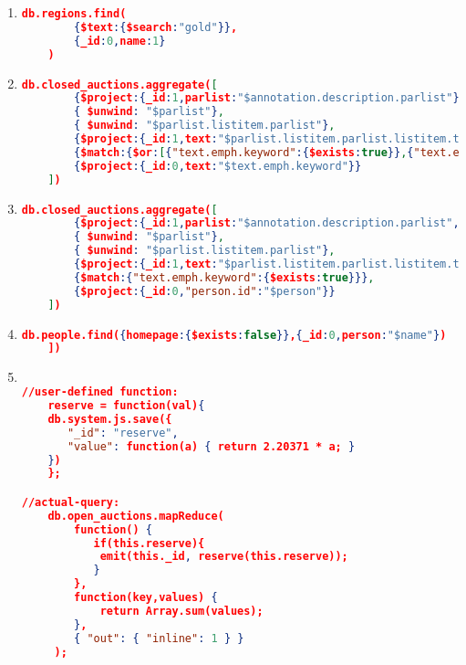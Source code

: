 \begin{enumerate}[label=Q\arabic*]
    \item \label{mongodb-q-14}%
	\begin{lstlisting}[language=JSON,   basicstyle=\scriptsize]
	  db.regions.find(
		{$text:{$search:"gold"}},
		{_id:0,name:1}
	)
	\end{lstlisting}
	
    \item \label{mongodb-q-15}%
	\begin{lstlisting}[language=JSON,   basicstyle=\scriptsize]
	 db.closed_auctions.aggregate([
		{$project:{_id:1,parlist:"$annotation.description.parlist"}},
		{ $unwind: "$parlist"},
		{ $unwind: "$parlist.listitem.parlist"},
		{$project:{_id:1,text:"$parlist.listitem.parlist.listitem.text"}},
		{$match:{$or:[{"text.emph.keyword":{$exists:true}},{"text.emph.keyword.childtext":{$exists:true}},{"text.emph.keyword.child":{$exists:true}}]}},
		{$project:{_id:0,text:"$text.emph.keyword"}}
	])
	\end{lstlisting}
	
    \item \label{mongodb-q-16}%
	\begin{lstlisting}[language=JSON,   basicstyle=\scriptsize]
	  db.closed_auctions.aggregate([
		{$project:{_id:1,parlist:"$annotation.description.parlist",person:"$seller.person"}},
		{ $unwind: "$parlist"},
		{ $unwind: "$parlist.listitem.parlist"},
		{$project:{_id:1,text:"$parlist.listitem.parlist.listitem.text",person:1}},
		{$match:{"text.emph.keyword":{$exists:true}}},
		{$project:{_id:0,"person.id":"$person"}}
	])
	\end{lstlisting}	

    \item \label{mongodb-q-17}%
	\begin{lstlisting}[language=JSON,   basicstyle=\scriptsize]
	  db.people.find({homepage:{$exists:false}},{_id:0,person:"$name"})
	])
	\end{lstlisting}	

    \item \label{mongodb-q-18}%
	\begin{lstlisting}[language=JSON,   basicstyle=\scriptsize]
	
//user-defined function:
    reserve = function(val){
    db.system.js.save({ 
       "_id": "reserve", 
       "value": function(a) { return 2.20371 * a; } 
    })
    };

//actual-query:
    db.open_auctions.mapReduce(
        function() {
           if(this.reserve){
            emit(this._id, reserve(this.reserve));
           }    
        },
        function(key,values) {
            return Array.sum(values);
        },
        { "out": { "inline": 1 } }
     );
\end{lstlisting}	


\end{enumerate}
